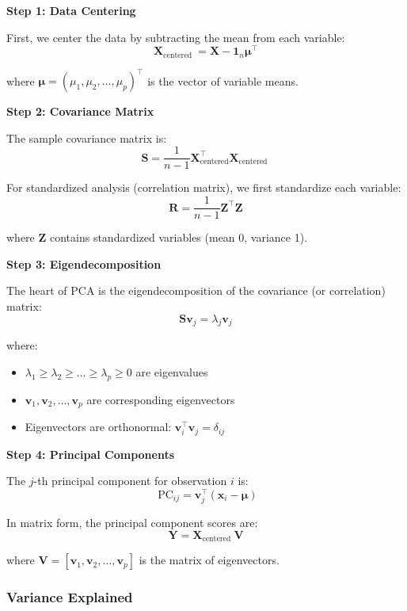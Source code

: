 \documentclass[
]{article}
\begin{document}
\textbf{Step 1: Data Centering}

First, we center the data by subtracting the mean from each variable:
\[\mathbf{X}_{\text{centered }} = \mathbf{X} - \mathbf{1}_{n}\mathbf{\mu}^{\top}\]

where
\(\mathbf{\mu} = \left( \mu_{1},\mu_{2},\ldots,\mu_{p} \right)^{\top}\)
is the vector of variable means.

\textbf{Step 2: Covariance Matrix}

The sample covariance matrix is:
\[\mathbf{S} = \frac{1}{n - 1}\mathbf{X}_{\text{centered}}^{\top}\mathbf{X}_{\text{centered }}\]

For standardized analysis (correlation matrix), we first standardize
each variable:
\[\mathbf{R} = \frac{1}{n - 1}\mathbf{Z}^{\top}\mathbf{Z}\]

where \(\mathbf{Z}\) contains standardized variables (mean 0, variance
1).

\textbf{Step 3: Eigendecomposition}

The heart of PCA is the eigendecomposition of the covariance (or
correlation) matrix:
\[\mathbf{S}\mathbf{v}_{j} = \lambda_{j}\mathbf{v}_{j}\]

where:

\begin{itemize}
\item
  \(\lambda_{1} \geq \lambda_{2} \geq \ldots \geq \lambda_{p} \geq 0\)
  are eigenvalues
\item
  \(\mathbf{v}_{1},\mathbf{v}_{2},\ldots,\mathbf{v}_{p}\) are
  corresponding eigenvectors
\item
  Eigenvectors are orthonormal:
  \(\mathbf{v}_{i}^{\top}\mathbf{v}_{j} = \delta_{ij}\)
\end{itemize}

\textbf{Step 4: Principal Components}

The \(j\)-th principal component for observation \(i\) is:
\[\text{ PC}_{ij} = \mathbf{v}_{j}^{\top}\left( \mathbf{x}_{i} - \mathbf{\mu} \right)\]

In matrix form, the principal component scores are:
\[\mathbf{Y} = \mathbf{X}_{\text{centered }}\mathbf{V}\]

where
\(\mathbf{V} = \left\lbrack \mathbf{v}_{1},\mathbf{v}_{2},\ldots,\mathbf{v}_{p} \right\rbrack\)
is the matrix of eigenvectors.

\subsubsection{Variance Explained}
\end{document}
